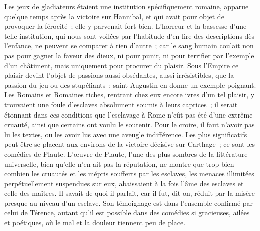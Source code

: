 \documentclass[french,twoside]{book} %
\begin{document}
Les jeux de gladiateurs étaient une institution spécifiquement romaine, apparue quelque temps après la victoire sur Hannibal, et qui avait pour objet de provoquer la férocité ; elle y parvenait fort bien. L'horreur et la bassesse d'une telle institution, qui nous sont voilées par l'habitude d'en lire des descriptions dès l'enfance, ne peuvent se comparer à rien d'autre ; car le sang humain coulait non pas pour gagner la faveur des dieux, ni pour punir, ni pour terrifier par l'exemple d'un châtiment, mais uniquement pour procurer du plaisir. Sous l'Empire ce plaisir devint l'objet de passions aussi obsédantes, aussi irrésistibles, que la passion du jeu ou des stupéfiants ; saint Augustin en donne un exemple poignant. Les Romains et Romaines riches, rentrant chez eux encore ivres d'un tel plaisir, y trouvaient une foule d'esclaves absolument soumis à leurs caprices ; il serait étonnant dans ces conditions que l'esclavage à Rome n'eût pas été d'une extrême cruauté, ainsi que certains ont voulu le soutenir. Pour le croire, il faut n'avoir pas lu les textes, ou les avoir lus avec une aveugle indifférence. Les plus significatifs peut-être se placent aux environs de la victoire décisive sur Carthage ; ce sont les comédies de Plaute. L'œuvre de Plaute, l'une des plus sombres de la littérature universelle, bien qu'elle n'en ait pas la réputation, ne montre que trop bien combien les cruautés et les mépris soufferts par les esclaves, les menaces illimitées perpétuellement suspendues sur eux, abaissaient à la fois l'âme des esclaves et celle des maî­tres. Il savait de quoi il parlait, car il fut, dit-on, réduit par la misère presque au niveau d'un esclave. Son témoignage est dans l'ensemble confirmé par celui de Térence, autant qu'il est possible dans des comédies si gracieuses, ailées et poétiques, où le mal et la douleur tiennent peu de place.\par
\end{document}
